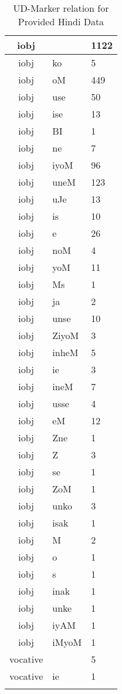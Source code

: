 \documentclass[a4 paper]{article}
\begin{document}
\begin{longtable}{cp{}p{}}
iobj &  & 1122\\ \midrule iobj & ko & 5\\ \midrule iobj & oM & 449\\ \midrule iobj & use & 50\\ \midrule iobj & ise & 13\\ \midrule iobj & BI & 1\\ \midrule iobj & ne & 7\\ \midrule iobj & iyoM & 96\\ \midrule iobj & uneM & 123\\ \midrule iobj & uJe & 13\\ \midrule iobj & is & 10\\ \midrule iobj & e & 26\\ \midrule iobj & noM & 4\\ \midrule iobj & yoM & 11\\ \midrule iobj & Ms & 1\\ \midrule iobj & ja & 2\\ \midrule iobj & unse & 10\\ \midrule iobj & ZiyoM & 3\\ \midrule iobj & inheM & 5\\ \midrule iobj & ie & 3\\ \midrule iobj & ineM & 7\\ \midrule iobj & usse & 4\\ \midrule iobj & eM & 12\\ \midrule iobj & Zne & 1\\ \midrule iobj & Z & 3\\ \midrule iobj & se & 1\\ \midrule iobj & ZoM & 1\\ \midrule iobj & unko & 3\\ \midrule iobj & isak & 1\\ \midrule iobj & M & 2\\ \midrule iobj & o & 1\\ \midrule iobj & s & 1\\ \midrule iobj & inak & 1\\ \midrule iobj & unke & 1\\ \midrule iobj & iyAM & 1\\ \midrule iobj & iMyoM & 1\\ \midrule 
vocative &  & 5\\ \midrule vocative & ie & 1\\ \midrule 
\caption{UD-Marker relation for Provided Hindi Data}
\label{tab:udmarkertable}
\end{longtable}
\end{document}
